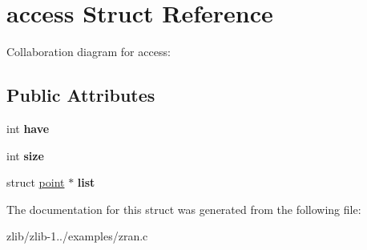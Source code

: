 \hypertarget{structaccess}{\section{access Struct Reference}
\label{structaccess}
}


Collaboration diagram for access\+:
\subsection*{Public Attributes}
\begin{DoxyCompactItemize}
\item 
\hypertarget{structaccess_a6068bfaf03188c5bbcaa977a792636a9}{int {\bfseries have}}\label{structaccess_a6068bfaf03188c5bbcaa977a792636a9}

\item 
\hypertarget{structaccess_aea01a7415e1faa507157b9301a58a052}{int {\bfseries size}}\label{structaccess_aea01a7415e1faa507157b9301a58a052}

\item 
\hypertarget{structaccess_aaaa3e08be3caace6a028782e61dfea41}{struct \hyperlink{structpoint}{point} $\ast$ {\bfseries list}}\label{structaccess_aaaa3e08be3caace6a028782e61dfea41}

\end{DoxyCompactItemize}


The documentation for this struct was generated from the following file\+:\begin{DoxyCompactItemize}
\item 
zlib/zlib-\/1../examples/zran.\+c\end{DoxyCompactItemize}
